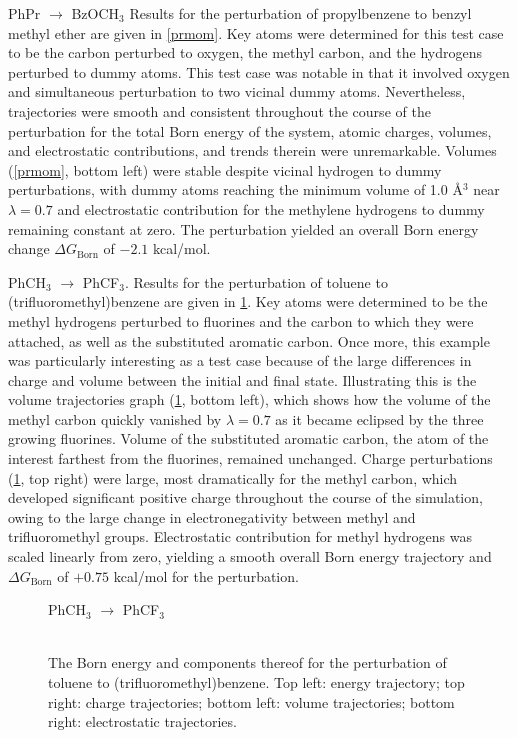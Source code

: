 \documentclass[12pt]{report}
\begin{document}
PhPr $\longrightarrow$ BzOCH$_3$ Results for the perturbation of propylbenzene to benzyl methyl ether are given in \cref{prmom}. Key atoms were determined for this test case to be the carbon perturbed to oxygen, the methyl carbon, and the hydrogens perturbed to dummy atoms. This test case was notable in that it involved oxygen and simultaneous perturbation to two vicinal dummy atoms. Nevertheless, trajectories were smooth and consistent throughout the course of the perturbation for the total Born energy of the system, atomic charges, volumes, and electrostatic contributions, and trends therein were unremarkable. Volumes (\cref{prmom}, bottom left) were stable despite vicinal hydrogen to dummy perturbations, with dummy atoms reaching the minimum volume of 1.0 \AA$^3$ near $\lambda = 0.7$ and electrostatic contribution for the methylene hydrogens to dummy remaining constant at zero. The perturbation yielded an overall Born energy change $\Delta G_{ \textrm{Born}}$ of $-2.1$ kcal/mol.

PhCH$_3$ $\longrightarrow$ PhCF$_3$. Results for the perturbation of toluene to (trifluoromethyl)benzene are given in \cref{ch3cf3}. Key atoms were determined to be the methyl hydrogens perturbed to fluorines and the carbon to which they were attached, as well as the substituted aromatic carbon. Once more, this example was particularly interesting as a test case because of the large differences in charge and volume between the initial and final state. Illustrating this is the volume trajectories graph (\cref{ch3cf3}, bottom left), which shows how the volume of the methyl carbon quickly vanished by $\lambda = 0.7$ as it became eclipsed by the three growing fluorines. Volume of the substituted aromatic carbon, the atom of the interest farthest from the fluorines, remained unchanged. Charge perturbations (\cref{ch3cf3}, top right) were large, most dramatically for the methyl carbon, which developed significant positive charge throughout the course of the simulation, owing to the large change in electronegativity between methyl and trifluoromethyl groups. Electrostatic contribution for methyl hydrogens was scaled linearly from zero, yielding a smooth overall Born energy trajectory and $\Delta G_{ \textrm{Born}}$ of $+0.75$ kcal/mol for the perturbation.


\begin{figure}[t!]
\centering
PhCH$_3$ $\longrightarrow$ PhCF$_3$\\
\hspace*{-1.3cm}\\
\hspace*{-1.3cm}
\caption{The Born energy and components thereof for the perturbation of toluene to (trifluoromethyl)benzene. Top left: energy trajectory; top right: charge trajectories; bottom left: volume trajectories; bottom right: electrostatic trajectories.}
\label{ch3cf3}
\end{figure}
\end{document}
